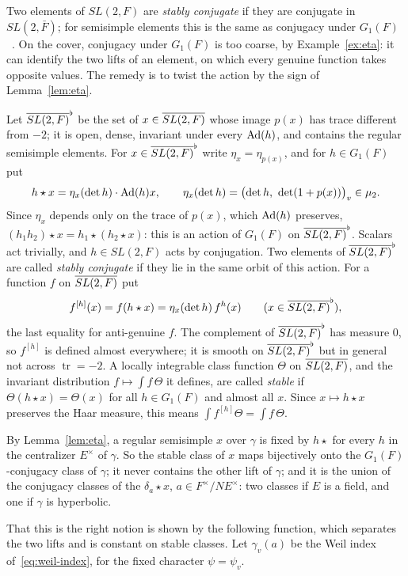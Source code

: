 Two elements of $SL(2,F)$ are \emph{stably conjugate} if they are
conjugate in $SL(2,\bar F)$; for semisimple elements this is the same as
conjugacy under $G_1(F)$~\cite{LL79}. On the cover, conjugacy under
$G_1(F)$ is too coarse, by Example~\ref{ex:eta}: it can identify the two
lifts of an element, on which every genuine function takes opposite
values. The remedy is to twist the action by the sign of
Lemma~\ref{lem:eta}.

Let $\overline{SL(2,F)}^\flat$ be the set of $x\in\overline{SL(2,F)}$ whose image $p(x)$ has trace
different from $-2$; it is open, dense, invariant under every
$\operatorname{Ad}(h)$, and contains the regular semisimple elements. For
$x\in\overline{SL(2,F)}^\flat$ write $\eta_x=\eta_{p(x)}$, and for $h\in G_1(F)$ put
\begin{equation}\label{eq:star}
h\star x=\eta_x(\det h)\cdot\operatorname{Ad}(h)x,\qquad
\eta_x(\det h)=\bigl(\det h,\ \det(1+p(x))\bigr)_v\in\mu_2 .
\end{equation}
Since $\eta_x$ depends only on the trace of $p(x)$, which
$\operatorname{Ad}(h)$ preserves, $(h_1h_2)\star x=h_1\star(h_2\star x)$: this
is an action of $G_1(F)$ on $\overline{SL(2,F)}^\flat$. Scalars act trivially, and
$h\in SL(2,F)$ acts by conjugation. Two elements of $\overline{SL(2,F)}^\flat$ are
called \emph{stably conjugate} if they lie in the same orbit of this
action. For a function $f$ on $\overline{SL(2,F)}$ put
\[
f^{[h]}(x)=f(h\star x)=\eta_x(\det h)\,f^h(x)\qquad(x\in\overline{SL(2,F)}^\flat),
\]
the last equality for anti-genuine $f$. The complement of $\overline{SL(2,F)}^\flat$ has
measure $0$, so $f^{[h]}$ is defined almost everywhere; it is smooth on
$\overline{SL(2,F)}^\flat$ but in general not across $\operatorname{tr}=-2$. A locally
integrable class function $\Theta$ on $\overline{SL(2,F)}$, and the invariant
distribution $f\mapsto\int f\,\Theta$ it defines, are called
\emph{stable} if $\Theta(h\star x)=\Theta(x)$ for all $h\in G_1(F)$ and
almost all $x$. Since $x\mapsto h\star x$ preserves the Haar measure,
this means $\int f^{[h]}\Theta=\int f\,\Theta$.

By Lemma~\ref{lem:eta}, a regular semisimple $x$ over $\gamma$ is fixed
by $h\star$ for every $h$ in the centralizer $E^\times$ of $\gamma$. So
the stable class of $x$ maps bijectively onto the $G_1(F)$-conjugacy
class of $\gamma$; it never contains the other lift of $\gamma$; and it
is the union of the conjugacy classes of the $\delta_a\star x$, $a\in
F^\times/N E^\times$: two classes if $E$ is a field, and one if $\gamma$
is hyperbolic.

That this is the right notion is shown by the following function, which
separates the two lifts and is constant on stable classes. Let
$\gamma_v(a)$ be the Weil index of~\eqref{eq:weil-index}, for the fixed
character $\psi=\psi_v$.

